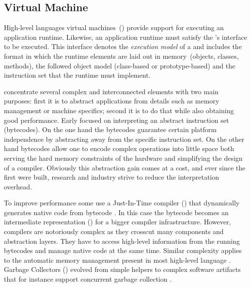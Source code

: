 \subsection{Virtual Machine}

High-level languages virtual machines~(\VMs) provide support for executing an application runtime.
Likewise, an application runtime must satisfy the \VM's interface to be executed.
This interface denotes the \emph{execution model} of a \VM and includes the format in which the runtime elements are laid out in memory~(objects, classes, methods), the followed object model (\eg class-based or prototype-based) and the instruction set that the runtime must implement.

\VMs concentrate several complex and interconnected elements with two main purposes: first it is to abstract applications from details such as memory management or machine specifics; second it is to do that while also obtaining good performance.
Early \VMs focused on interpreting an abstract instruction set (bytecodes).
On the one hand the bytecodes guarantee certain platform independence by abstracting away from the \CPU specific instruction set.
On the other hand bytecodes allow one to encode complex operations into little space both serving the hard memory constraints of the hardware and simplifying the design of a compiler.
Obviously this abstraction gain comes at a cost, and ever since the first \VMs were built, research and industry strive to reduce the interpretation overhead.


To improve performance some \VMs use a Just-In-Time compiler (\JIT) that dynamically generates native code from bytecode \cite{Deut84a}.
In this case the bytecode becomes an intermediate representation (\IR) for a bigger compiler infrastructure.
However, \JIT compilers are notoriously complex as they crosscut many \VM components and abstraction layers. They have to access high-level information from the running bytecodes and manage native code at the same time.
Similar complexity applies to the automatic memory management present in most high-level language \VMs.
Garbage Collectors (\GC) evolved from simple helpers to complex software artifacts that for instance support concurrent garbage collection \cite{Clic05a}.


